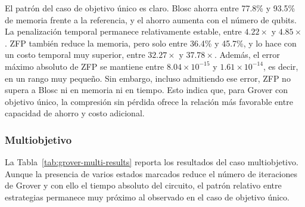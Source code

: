 El patrón del caso de objetivo único es claro. Blosc ahorra entre 77.8\% y 93.5\% de memoria
frente a la referencia, y el ahorro aumenta con el número de qubits. La penalización temporal
permanece relativamente estable, entre $4.22\times$ y $4.85\times$. ZFP también reduce la
memoria, pero solo entre 36.4\% y 45.7\%, y lo hace con un costo temporal muy superior, entre
$32.27\times$ y $37.78\times$. Además, el error máximo absoluto de ZFP se mantiene entre
$8.04\times10^{-15}$ y $1.61\times10^{-14}$, es decir, en un rango muy pequeño. Sin embargo,
incluso admitiendo ese error, ZFP no supera a Blosc ni en memoria ni en tiempo. Esto indica
que, para Grover con objetivo único, la compresión sin pérdida ofrece la relación más
favorable entre capacidad de ahorro y costo adicional.

\subsubsection{Multiobjetivo}

La Tabla~\ref{tab:grover-multi-results} reporta los resultados del caso multiobjetivo. Aunque
la presencia de varios estados marcados reduce el número de iteraciones de Grover y con ello
el tiempo absoluto del circuito, el patrón relativo entre estrategias permanece muy próximo al
observado en el caso de objetivo único.

\begin{table}[H]
    \centering
    \small
    \setlength{\tabcolsep}{3pt}
    \caption{Grover multiobjetivo con tres estados marcados}
    \label{tab:grover-multi-results}
\end{table}

